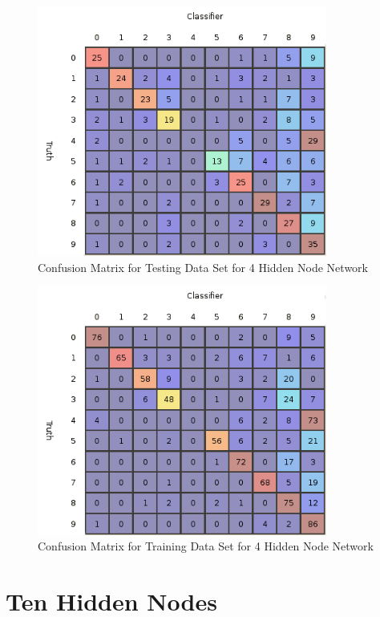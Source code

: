 \documentclass{article}
\begin{document}
\begin{figure}
\centering
\includegraphics[width=0.85\textwidth]{data/final/4_test_confusion.png}
\caption{Confusion Matrix for Testing Data Set for 4 Hidden Node Network}
\label{testconfusion4}
\end{figure}

\begin{figure}
\centering
\includegraphics[width=0.85\textwidth]{data/final/4_train_confusion.png}
\caption{Confusion Matrix for Training Data Set for 4 Hidden Node Network}
\label{trainconfusion4}
\end{figure}

\section{Ten Hidden Nodes}\label{hidden10}
\end{document}
